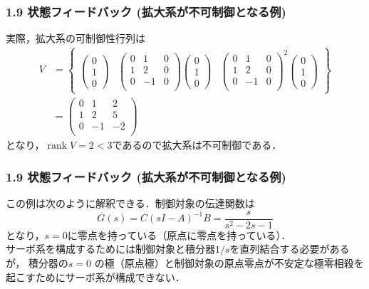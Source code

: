 \documentclass[10pt]{beamer}
\begin{document}
\begin{frame}[t]
\frametitle{1.9 状態フィードバック (拡大系が不可制御となる例)}
実際，拡大系の可制御性行列は
\begin{align}
 V &=
 \left\{
 \begin{array}{ccc}
 \left(
 \begin{array}{c}
  0 \\
  1 \\
  0
 \end{array}
 \right) &
 \left(
 \begin{array}{ccc}
  0 & 1 & 0 \\
  1 & 2 & 0 \\
  0 & -1 & 0 \\
 \end{array}
 \right)
 \left(
 \begin{array}{c}
  0 \\
  1 \\
  0
 \end{array}
 \right) &
 \left(
 \begin{array}{ccc}
  0 & 1 & 0 \\
  1 & 2 & 0 \\
  0 & -1 & 0 \\
 \end{array}
 \right)^2
 \left(
 \begin{array}{c}
  0 \\
  1 \\
  0
 \end{array}
 \right)
 \end{array}
 \right\} \nonumber\\ &=
 \left(
 \begin{array}{ccc}
  0 & 1 & 2 \\
  1 & 2 & 5 \\
  0 & -1 & -2 \\
 \end{array}
 \right)\nonumber
\end{align}
となり，$\operatorname{rank} V = 2<3$であるので拡大系は不可制御である．\\
\end{frame}


\begin{frame}[t]
\frametitle{1.9 状態フィードバック (拡大系が不可制御となる例)}
この例は次のように解釈できる．制御対象の伝達関数は
\[
 G(s) = C(sI-A)^{-1}B = \frac{s}{s^2-2s-1}
\]
となり，$s=0$に零点を持っている（原点に零点を持っている）．\\
サーボ系を構成するためには制御対象と積分器$1/s$を直列結合する必要があるが，
積分器の$s=0$ の極（原点極）と制御対象の原点零点が不安定な極零相殺を起こすためにサーボ系が構成できない．
\end{frame}
\end{document}
